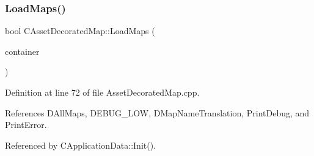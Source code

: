 \subsubsection{\texorpdfstring{Load\+Maps()}{LoadMaps()}}
{\footnotesize\ttfamily bool C\+Asset\+Decorated\+Map\+::\+Load\+Maps (\begin{DoxyParamCaption}\item[{std\+::shared\+\_\+ptr$<$ \hyperlink{classCDataSourceContainer}{C\+Data\+Source\+Container} $>$}]{container }\end{DoxyParamCaption})\hspace{0.3cm}{\ttfamily [static]}}



Definition at line 72 of file Asset\+Decorated\+Map.\+cpp.



References D\+All\+Maps, D\+E\+B\+U\+G\+\_\+\+L\+OW, D\+Map\+Name\+Translation, Print\+Debug, and Print\+Error.



Referenced by C\+Application\+Data\+::\+Init().


